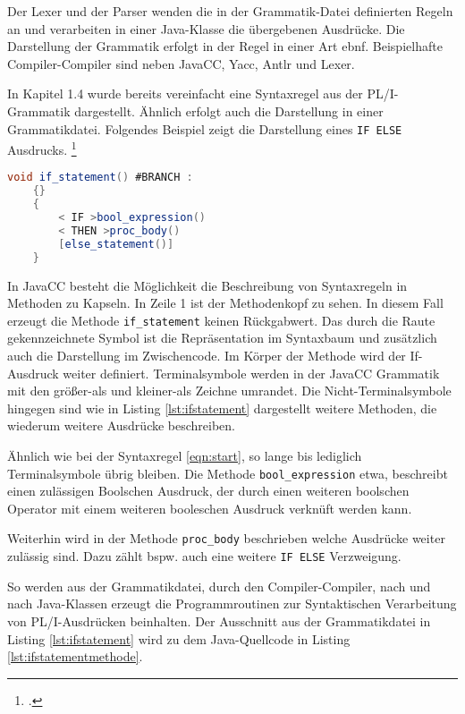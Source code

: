 Der Lexer und der Parser wenden die in der Grammatik-Datei definierten Regeln an und verarbeiten in einer Java-Klasse die übergebenen Ausdrücke.
Die Darstellung der Grammatik erfolgt in der Regel in einer Art \ac{ebnf}. 
Beispielhafte Compiler-Compiler sind neben JavaCC, Yacc, Antlr und Lexer.


In Kapitel 1.4 wurde bereits vereinfacht eine Syntaxregel aus der PL/I-Grammatik dargestellt. Ähnlich erfolgt auch die Darstellung in einer Grammatikdatei. Folgendes Beispiel zeigt die Darstellung eines \verb+IF ELSE+ Ausdrucks. 
\footcite[Vgl. ][]{javaccdoku}


\begin{lstlisting}[language=Java, caption=If Statement aus der Grammatikdatei, label={lst:ifstatement}]
	void if_statement() #BRANCH :
	{}
	{
		< IF >bool_expression()
		< THEN >proc_body()
		[else_statement()]
	}
\end{lstlisting}

In JavaCC besteht die Möglichkeit die Beschreibung von Syntaxregeln in Methoden zu Kapseln.
In Zeile 1 ist der Methodenkopf zu sehen. In diesem Fall erzeugt die Methode \verb+if_statement+ keinen Rückgabwert.
Das durch die Raute gekennzeichnete Symbol ist die Repräsentation im Syntaxbaum und zusätzlich auch die Darstellung im Zwischencode.
Im Körper der Methode wird der If-Ausdruck weiter definiert. Terminalsymbole werden in der JavaCC Grammatik mit den größer-als und kleiner-als Zeichne umrandet. Die Nicht-Terminalsymbole hingegen sind wie in Listing \ref{lst:ifstatement} dargestellt weitere Methoden, die wiederum weitere Ausdrücke beschreiben.

Ähnlich wie bei der Syntaxregel \ref{eqn:start}, so lange bis lediglich Terminalsymbole übrig bleiben.
Die Methode \verb+bool_expression+ etwa, beschreibt einen zulässigen Boolschen Ausdruck, der durch einen weiteren boolschen Operator mit einem weiteren booleschen Ausdruck verknüft werden kann.

Weiterhin wird in der Methode \verb+proc_body+ beschrieben welche Ausdrücke weiter zulässig sind. Dazu zählt bspw. auch eine weitere \verb+IF ELSE+ Verzweigung. 

 So werden aus der Grammatikdatei, durch den Compiler-Compiler, nach und nach Java-Klassen erzeugt die Programmroutinen zur Syntaktischen Verarbeitung von PL/I-Ausdrücken beinhalten.
Der Ausschnitt aus der Grammatikdatei in Listing \ref{lst:ifstatement} wird zu dem Java-Quellcode in Listing \ref{lst:ifstatementmethode}.


